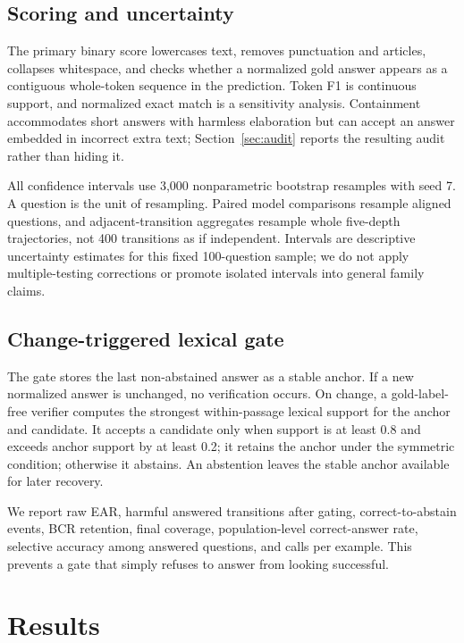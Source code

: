 \documentclass[10pt,twocolumn]{article}
\begin{document}
\subsection{Scoring and uncertainty}

The primary binary score lowercases text, removes punctuation and articles, collapses whitespace, and checks whether a normalized gold answer appears as a contiguous whole-token sequence in the prediction. Token F1 is continuous support, and normalized exact match is a sensitivity analysis. Containment accommodates short answers with harmless elaboration but can accept an answer embedded in incorrect extra text; Section~\ref{sec:audit} reports the resulting audit rather than hiding it.

All confidence intervals use 3,000 nonparametric bootstrap resamples with seed 7. A question is the unit of resampling. Paired model comparisons resample aligned questions, and adjacent-transition aggregates resample whole five-depth trajectories, not 400 transitions as if independent. Intervals are descriptive uncertainty estimates for this fixed 100-question sample; we do not apply multiple-testing corrections or promote isolated intervals into general family claims.

\subsection{Change-triggered lexical gate}

The gate stores the last non-abstained answer as a stable anchor. If a new normalized answer is unchanged, no verification occurs. On change, a gold-label-free verifier computes the strongest within-passage lexical support for the anchor and candidate. It accepts a candidate only when support is at least 0.8 and exceeds anchor support by at least 0.2; it retains the anchor under the symmetric condition; otherwise it abstains. An abstention leaves the stable anchor available for later recovery.

We report raw EAR, harmful answered transitions after gating, correct-to-abstain events, BCR retention, final coverage, population-level correct-answer rate, selective accuracy among answered questions, and calls per example. This prevents a gate that simply refuses to answer from looking successful.

\section{Results}
\end{document}
